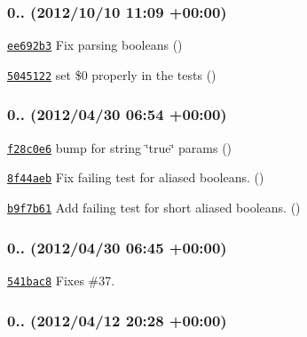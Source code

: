 \subsubsection*{0.. (2012/10/10 11\+:09 +00\+:00)}


\begin{DoxyItemize}
\item \href{https://github.com/bcoe/yargs/commit/ee692b37554c70a0bb16389a50a26b66745cbbea}{\tt ee692b3} Fix parsing booleans ()
\item \href{https://github.com/bcoe/yargs/commit/5045122664c3f5b4805addf1be2148d5856f7ce8}{\tt 5045122} set \$0 properly in the tests ()
\end{DoxyItemize}

\subsubsection*{0.. (2012/04/30 06\+:54 +00\+:00)}


\begin{DoxyItemize}
\item \href{https://github.com/bcoe/yargs/commit/f28c0e62ca94f6e0bb2e6d82fc3d91a55e69b903}{\tt f28c0e6} bump for string \char`\"{}true\char`\"{} params ()
\item \href{https://github.com/bcoe/yargs/commit/8f44aeb74121ddd689580e2bf74ef86a605e9bf2}{\tt 8f44aeb} Fix failing test for aliased booleans. ()
\item \href{https://github.com/bcoe/yargs/commit/b9f7b613b1e68e11e6c23fbda9e555a517dcc976}{\tt b9f7b61} Add failing test for short aliased booleans. ()
\end{DoxyItemize}

\subsubsection*{0.. (2012/04/30 06\+:45 +00\+:00)}


\begin{DoxyItemize}
\item \href{https://github.com/bcoe/yargs/commit/541bac8dd787a5f1a5d28f6d8deb1627871705e7}{\tt 541bac8} Fixes \#37.
\end{DoxyItemize}

\subsubsection*{0.. (2012/04/12 20\+:28 +00\+:00)}


